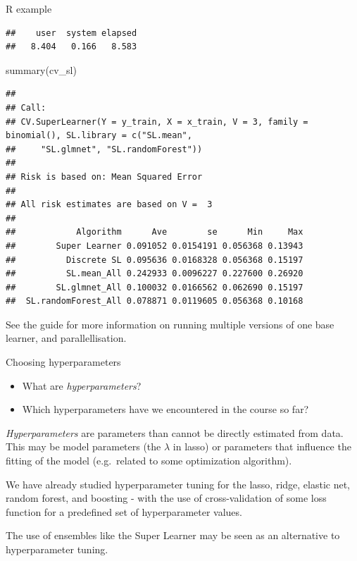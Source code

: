 \documentclass[
  ignorenonframetext,
]{beamer}
\newenvironment{Shaded}{\begin{snugshade}}{\end{snugshade}}
\newcommand{\FunctionTok}[1]{\textcolor[rgb]{0.00,0.00,0.00}{#1}}
\newcommand{\NormalTok}[1]{#1}
\providecommand{\tightlist}{%
  \setlength{\itemsep}{0pt}\setlength{\parskip}{0pt}}
\begin{document}
\begin{frame}[fragile]
\begin{block}{R example}
\begin{verbatim}
##    user  system elapsed 
##   8.404   0.166   8.583
\end{verbatim}

\begin{Shaded}
\begin{Highlighting}[]
\FunctionTok{summary}\NormalTok{(cv\_sl)}
\end{Highlighting}
\end{Shaded}

\begin{verbatim}
## 
## Call:  
## CV.SuperLearner(Y = y_train, X = x_train, V = 3, family = binomial(), SL.library = c("SL.mean",  
##     "SL.glmnet", "SL.randomForest")) 
## 
## Risk is based on: Mean Squared Error
## 
## All risk estimates are based on V =  3 
## 
##            Algorithm      Ave        se      Min     Max
##        Super Learner 0.091052 0.0154191 0.056368 0.13943
##          Discrete SL 0.095636 0.0168328 0.056368 0.15197
##          SL.mean_All 0.242933 0.0096227 0.227600 0.26920
##        SL.glmnet_All 0.100032 0.0166562 0.062690 0.15197
##  SL.randomForest_All 0.078871 0.0119605 0.056368 0.10168
\end{verbatim}

See the guide for more information on running multiple versions of one
base learner, and parallellisation.
\end{block}
\end{frame}

\begin{frame}{Choosing hyperparameters}
\protect\hypertarget{choosing-hyperparameters}{}
\begin{itemize}
\tightlist
\item
  What are \emph{hyperparameters}?
\item
  Which hyperparameters have we encountered in the course so far?
\end{itemize}
\end{frame}

\begin{frame}
\emph{Hyperparameters} are parameters than cannot be directly estimated
from data. This may be model parameters (the \(\lambda\) in lasso) or
parameters that influence the fitting of the model (e.g.~related to some
optimization algorithm).

We have already studied hyperparameter tuning for the lasso, ridge,
elastic net, random forest, and boosting - with the use of
cross-validation of some loss function for a predefined set of
hyperparameter values.

The use of ensembles like the Super Learner may be seen as an
alternative to hyperparameter tuning.
\end{frame}
\end{document}
